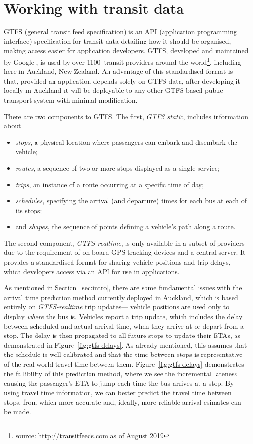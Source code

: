 \section{Working with \rt transit data}
\label{sec:gtfs}


GTFS (general transit feed specification)
is an API (application programming interface) specification for transit data
detailing how it should be organised,
making access easier for application developers.
GTFS, developed and maintained by Google \citep{GoogleDevelopers_2006},
is used by over 1100~transit providers around the world\footnote{%
source: \url{http://transitfeeds.com} as of August 2019},
including here in Auckland, New Zealand.
An advantage of this standardised format is that,
provided an application depends solely on GTFS data,
after developing it locally in Auckland it will be deployable to any other GTFS-based
public transport system with minimal modification.


There are two components to GTFS.
The first, \emph{GTFS static}, includes information about
\begin{itemize}
\item \emph{stops}, a physical location where passengers can embark and disembark the vehicle;
\item \emph{routes}, a sequence of two or more stops displayed as a single service;
\item \emph{trips}, an instance of a route occurring at a specific time of day;
\item \emph{schedules}, specifying the arrival (and departure) times for each bus at each of its stops; 
\item and \emph{shapes}, the sequence of points defining a vehicle's path along a route.
\end{itemize}
The second component, \emph{GTFS-realtime},
is only available in a subset of providers due to the requirement of 
on-board GPS tracking devices and a central server.
It provides a standardised format for sharing vehicle positions and trip delays,
which developers access via an API for use in \rt applications.

As mentioned in Section~\ref{sec:intro},
there are some fundamental issues with the arrival time prediction method currently
deployed in Auckland,
which is based entirely on \emph{GTFS-realtime} trip updates---%
vehicle positions are used only to display \emph{where} the bus is.
Vehicles report a trip update,
which includes the delay between scheduled and actual arrival time,
when they arrive at or depart from a stop.
The delay is then propagated to all future stops to update their ETAs,
as demonstrated in Figure~\ref{fig:gtfs-delays}.
As already mentioned, this assumes that the schedule is well-calibrated
and that the time between stops
is representative of the real-world travel time between them. 
Figure~\ref{fig:gtfs-delays} demonstrates the fallibility of this prediction method,
where we see the incremental lateness causing the passenger's ETA to 
jump each time the bus arrives at a stop.
By using \rt travel time information,
we can better predict the travel time between stops,
from which more accurate and, ideally, more reliable arrival esimates
can be made.


